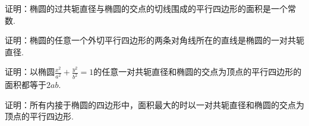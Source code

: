 \begin{example}
证明：椭圆的过共轭直径与椭圆的交点的切线围成的平行四边形的面积是一个常数.
\end{example}

\begin{example}
证明：椭圆的任意一个外切平行四边形的两条对角线所在的直线是椭圆的一对共轭直径.
\end{example}

\begin{example}
证明：以椭圆\(
	\frac{x^2}{a^2} + \frac{y^2}{b^2} = 1
\)的任意一对共轭直径和椭圆的交点为顶点的平行四边形的面积都等于\(2ab\).
\end{example}

\begin{example}
证明：所有内接于椭圆的四边形中，面积最大的时以一对共轭直径和椭圆的交点为顶点的平行四边形.
\end{example}
